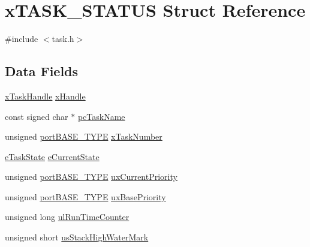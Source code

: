 \hypertarget{structx_t_a_s_k___s_t_a_t_u_s}{}\section{x\+T\+A\+S\+K\+\_\+\+S\+T\+A\+T\+US Struct Reference}
\label{structx_t_a_s_k___s_t_a_t_u_s}


{\ttfamily \#include $<$task.\+h$>$}

\subsection*{Data Fields}
\begin{DoxyCompactItemize}
\item 
\mbox{\hyperlink{task_8h_a271ae40d5db07d928a113766505a0965}{x\+Task\+Handle}} \mbox{\hyperlink{structx_t_a_s_k___s_t_a_t_u_s_a16b862ad7f2460c2575d14350b5e7270}{x\+Handle}}
\item 
const signed char $\ast$ \mbox{\hyperlink{structx_t_a_s_k___s_t_a_t_u_s_a0b00a968685528cecb83b8d7f22b7863}{pc\+Task\+Name}}
\item 
unsigned \mbox{\hyperlink{portmacro_8h_a1ebe82d24d764ae4e352f7c3a9f92c01}{port\+B\+A\+S\+E\+\_\+\+T\+Y\+PE}} \mbox{\hyperlink{structx_t_a_s_k___s_t_a_t_u_s_a14a06c8bd78b7f60f9395593ac06b286}{x\+Task\+Number}}
\item 
\mbox{\hyperlink{task_8h_a1749369458e2282a22e862a619a3892c}{e\+Task\+State}} \mbox{\hyperlink{structx_t_a_s_k___s_t_a_t_u_s_a727e904e3afe49472b0fc6a4e96439cb}{e\+Current\+State}}
\item 
unsigned \mbox{\hyperlink{portmacro_8h_a1ebe82d24d764ae4e352f7c3a9f92c01}{port\+B\+A\+S\+E\+\_\+\+T\+Y\+PE}} \mbox{\hyperlink{structx_t_a_s_k___s_t_a_t_u_s_a381d967bd2222b5cb98efa708ae8a4d3}{ux\+Current\+Priority}}
\item 
unsigned \mbox{\hyperlink{portmacro_8h_a1ebe82d24d764ae4e352f7c3a9f92c01}{port\+B\+A\+S\+E\+\_\+\+T\+Y\+PE}} \mbox{\hyperlink{structx_t_a_s_k___s_t_a_t_u_s_a8bc6dc2f8978353bd749865e0df234bc}{ux\+Base\+Priority}}
\item 
unsigned long \mbox{\hyperlink{structx_t_a_s_k___s_t_a_t_u_s_a494d5201034e99551b51c94be3cfe34e}{ul\+Run\+Time\+Counter}}
\item 
unsigned short \mbox{\hyperlink{structx_t_a_s_k___s_t_a_t_u_s_a1563de12a37cce2c0cca1b7bdea81848}{us\+Stack\+High\+Water\+Mark}}
\end{DoxyCompactItemize}


